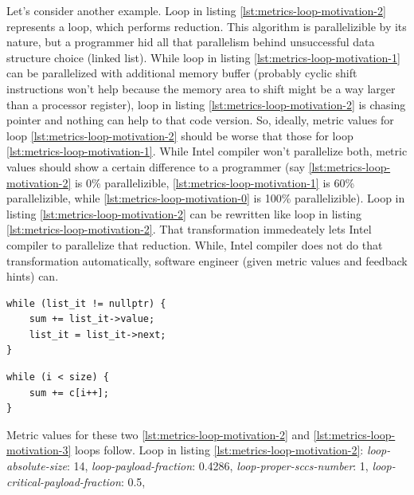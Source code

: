 \null\qquad Let's consider another example. Loop in listing \ref{lst:metrics-loop-motivation-2} represents a loop, which performs reduction. This algorithm is parallelizible by its nature, but a programmer hid all that parallelism behind unsuccessful data structure choice (linked list). While loop in listing \ref{lst:metrics-loop-motivation-1} can be parallelized with additional memory buffer (probably cyclic shift instructions won't help because the memory area to shift might be a way larger than a processor register), loop in listing \ref{lst:metrics-loop-motivation-2} is chasing pointer and nothing can help to that code version. So, ideally, metric values for loop \ref{lst:metrics-loop-motivation-2} should be worse that those for loop \ref{lst:metrics-loop-motivation-1}. While Intel compiler won't parallelize both, metric values should show a certain difference to a programmer (say \ref{lst:metrics-loop-motivation-2} is 0\% parallelizible, \ref{lst:metrics-loop-motivation-1} is 60\% parallelizible, while \ref{lst:metrics-loop-motivation-0} is 100\% parallelizible).\newline
\null\qquad Loop in listing \ref{lst:metrics-loop-motivation-2} can be rewritten like loop in listing \ref{lst:metrics-loop-motivation-2}. That transformation immedeately lets Intel compiler to parallelize that reduction. While, Intel compiler does not do that transformation automatically, software engineer (given metric values and feedback hints) can.   
\begin{lstlisting}[caption={Algorithmic reduction, hidden behind unsuccessful data structure choice (linked-list). If linear array was used instead, the loop would be parallelized by Intel compiler. Intel compiler reports: "not a parallel candidate" for that version}, captionpos=b, label=lst:metrics-loop-motivation-2]
while (list_it != nullptr) {
	sum += list_it->value;
    list_it = list_it->next;
}
\end{lstlisting}
\begin{lstlisting}[caption={Loop with optimal data structure choice for algorithmic reduction. Intel compiler successfully parallelizes it.}, captionpos=b, label=lst:metrics-loop-motivation-3]
while (i < size) {
	sum += c[i++];
}
\end{lstlisting}
\null\qquad Metric values for these two \ref{lst:metrics-loop-motivation-2} and \ref{lst:metrics-loop-motivation-3} loops follow.\newline
\null\qquad Loop in listing \ref{lst:metrics-loop-motivation-2}: \textit{loop-absolute-size}: 14, \textit{loop-payload-fraction}: 0.4286, \textit{loop-proper-sccs-number}: 1, \textit{loop-critical-payload-fraction}: 0.5,
